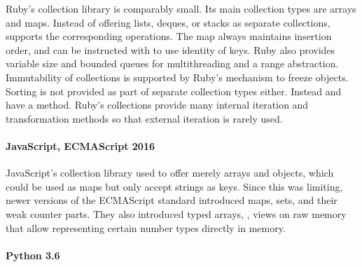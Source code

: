 \documentclass[sigconf, 10pt]{acmart}
\begin{document}
Ruby's collection library is comparably small.
Its main collection types are arrays and maps.
Instead of offering lists, deques, or stacks as separate collections,
 supports the corresponding operations.
The  map always maintains insertion order,
and can be instructed with  to use identity of keys.
Ruby also provides variable size and bounded queues for multithreading and a range abstraction.
Immutability of collections is supported by Ruby's mechanism to freeze objects.
Sorting is not provided as part of separate collection types either.
Instead  and  have a  method.
Ruby's collections provide many internal iteration
and transformation methods so that external iteration is rarely used.

\paragraph{JavaScript, ECMAScript 2016}

JavaScript's collection library used to offer merely
arrays and objects, which could be used as maps but only accept strings as keys.
Since this was limiting,
newer versions of the ECMAScript standard introduced maps, sets,
and their weak counter parts.
They also introduced typed arrays, \ie,
views on raw memory that allow representing certain number types
directly in memory.

\paragraph{Python 3.6}
\end{document}
